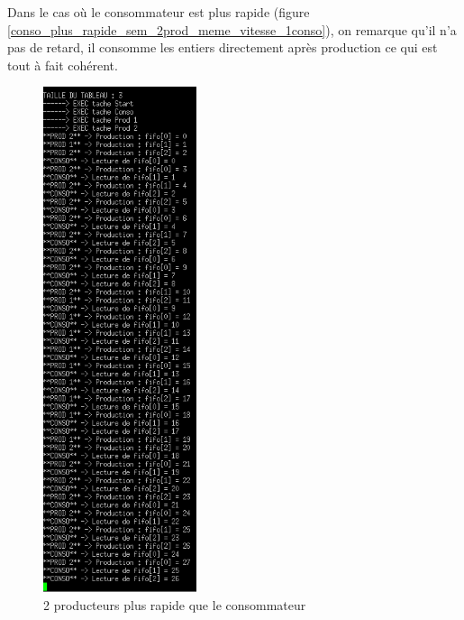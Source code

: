 \documentclass[a4paper,12pt]{report}
\begin{document}
Dans le cas où le consommateur est plus rapide (figure \ref{conso_plus_rapide_sem_2prod_meme_vitesse_1conso}), on remarque qu'il n'a pas de retard, il consomme les entiers directement après production ce qui est tout à fait cohérent.

\newpage

\begin{figure}[h]
	\centering
		\includegraphics[width=0.4\textwidth]{screens/prod_plus_rapide_sem_2prod_meme_vitesse_1conso.png}
		\caption{2 producteurs plus rapide que le consommateur}
		\label{prod_plus_rapide_sem_2prod_meme_vitesse_1conso}
\end{figure}

\newpage
\end{document}
